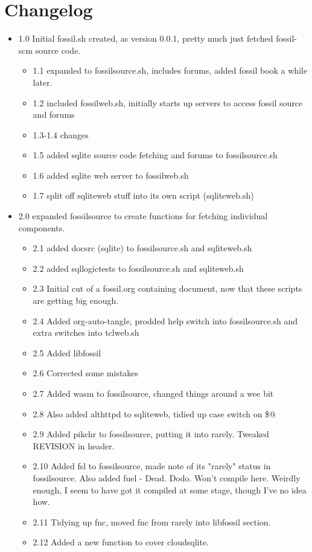 \documentclass[11pt]{article}
\begin{document}
\section*{Changelog}
\label{sec:orgd3058a4}
\begin{itemize}
\item 1.0 Initial fossil.sh created, as version 0.0.1, pretty much just fetched fossil-scm source
code.
\begin{itemize}
\item 1.1 expanded to fossilsource.sh, includes forums, added fossil book a while later.
\item 1.2 included fossilweb.sh, initially starts up servers to access fossil source and forums
\item 1.3-1.4 changes
\item 1.5 added sqlite source code fetching and forums to fossilsource.sh
\item 1.6 added sqlite web server to fossilweb.sh
\item 1.7 split off sqliteweb stuff into its own script (sqliteweb.sh)
\end{itemize}
\item 2.0 expanded fossilsource to create functions for fetching individual components.
\begin{itemize}
\item 2.1 added docsrc (sqlite) to fossilsource.sh and sqliteweb.sh
\item 2.2 added sqllogictests to fossilsource.sh and sqliteweb.sh

\item 2.3 Initial cut of a fossil.org containing document, now that these scripts are getting big
enough.
\item 2.4 Added org-auto-tangle, prodded help switch into fossilsource.sh and extra switches into tclweb.sh
\item 2.5 Added libfossil
\item 2.6 Corrected some mistakes
\item 2.7 Added wasm to fossilsource, changed things around a wee bit
\item 2.8 Also added althttpd to sqliteweb, tidied up case switch on \$@
\item 2.9 Added pikchr to fossilsource, putting it into rarely. Tweaked REVISION in header.
\item 2.10 Added fsl to fossilsource, made note of its "rarely" status in fossilsource. 
Also added fuel - Dead. Dodo. Won't compile here. Weirdly enough, I seem to have got it compiled at some stage, though I've no idea how.
\item 2.11 Tidying up fnc, moved fnc from rarely into libfossil section.
\item 2.12 Added a new function to cover cloudsqlite.
\end{itemize}
\end{itemize}
\newpage
\end{document}
